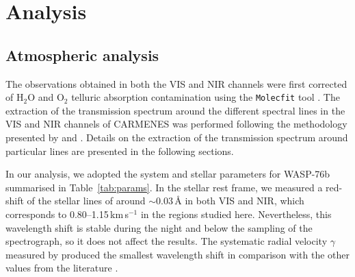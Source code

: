 \documentclass{aa}
\begin{document}

\section{Analysis} \label{sec:analysis}

\subsection{Atmospheric analysis}

The observations obtained in both the VIS and NIR channels were first corrected of H$_2$O and O$_2$ telluric absorption contamination using the {\tt Molecfit} tool \citep{Molecfit1,Molecfit2}. The extraction of the transmission spectrum around the different spectral lines in the VIS and NIR channels of CARMENES was performed following the methodology presented by \citet{Wytt2015} and \citet{2017CasasayasB}. Details on the extraction of the transmission spectrum around particular lines are presented in the following sections. 

In our analysis, we adopted the system and stellar parameters for WASP-76b summarised in Table~\ref{tab:params}. 
In the stellar rest frame, we measured a red-shift of the stellar lines of around $\sim 0.03$\,{\AA} in both VIS and NIR, which corresponds to 0.80--1.15\,km\,s$^{-1}$ in the regions studied here. Nevertheless, this wavelength shift is stable during the night and below the sampling of the spectrograph, so it does not affect the results. The systematic radial velocity $\gamma$ measured by \citet{West2016} produced the smallest wavelength shift in comparison with the other values from the literature \citep[e.g.][]{Ehrenreich2020}. 
\end{document}
